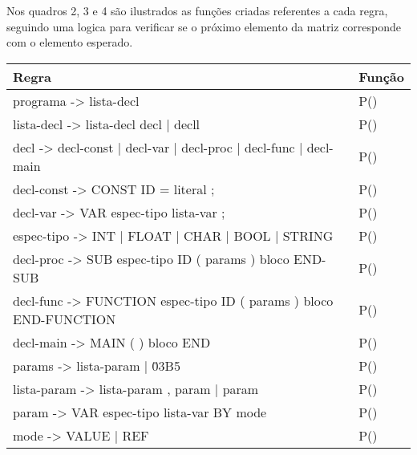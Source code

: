 \documentclass[12pt,oneside,a4paper,chapter=TITLE,section=TITLE,sumario=tradicional]{abntex2}
\begin{document}
Nos quadros 2, 3 e 4 são ilustrados as funções criadas referentes a cada regra, seguindo uma logica para verificar se o próximo elemento da matriz corresponde com o elemento esperado. 

\begin{quadro}[htb]
    \centering
    \vspace{0.5cm}
    \begin{tabular}[h]{|p{13.0cm}|p{2.0cm}|}
        \hline
        \textbf{Regra} & \textbf{Função} \\ 
        \hline\hline
	programa -> lista-decl  & P()   \\ \hline 
	lista-decl -> lista-decl decl | decll  & P()   \\ \hline 
	decl -> decl-const | decl-var | decl-proc | decl-func | decl-main  & P() \\ \hline
	decl-const -> CONST ID = literal ;  & P()   \\ \hline 
	decl-var -> VAR espec-tipo lista-var ;  & P()   \\ \hline 
	espec-tipo -> INT | FLOAT | CHAR | BOOL | STRING  & P()   \\ \hline 
	decl-proc -> SUB espec-tipo ID ( params ) bloco END-SUB  & P()   \\ \hline 
	decl-func -> FUNCTION espec-tipo ID ( params ) bloco END-FUNCTION  & P()   \\ \hline 
	decl-main -> MAIN ( ) bloco END  & P()   \\ \hline 
	params -> lista-param | \u03B5  & P()   \\ \hline 
	lista-param -> lista-param , param | param  & P()   \\ \hline 
	param -> VAR espec-tipo lista-var BY mode  & P()   \\ \hline 
	mode -> VALUE | REF  & P()   \\ \hline 
    \end{tabular}
\end{quadro}
\end{document}

